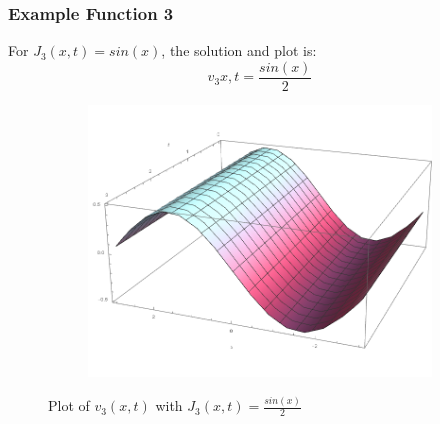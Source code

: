 \documentclass[12pt]{article}
\begin{document}
\pagebreak
\subsubsection{Example Function 3}
For $J_{3}(x,t) = sin(x)$, the solution and plot is:
$$ v_3{x,t} = \frac{sin(x)}{2} $$

\begin{figure}[H]
	\centering
	\begin{subfigure}[h]{0.8\textwidth}
        \includegraphics[width=\textwidth]{Part1Plots/plot3}
    \end{subfigure}
    \caption{Plot of $v_{3}(x,t)$ with $ J_3(x,t) = \frac{sin(x)}{2} $ } \label{fig:jext3}
\end{figure}

\pagebreak
\end{document}
